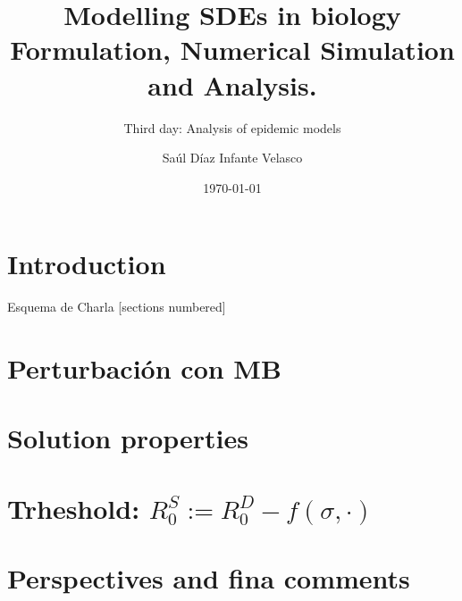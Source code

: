 \documentclass[9pt]{beamer}
\title{Modelling SDEs in biology\\
    Formulation, Numerical Simulation and Analysis.}
\subtitle{Third day: Analysis of epidemic models}
\author{Saúl Díaz Infante Velasco}
\institute{CONACYT-UNIVERSIDAD de SONORA, Cimat, Guanajuato Gto}
\date{\today}
\begin{document}
    \titlepage
    
    \section{Introduction}
         
         
         
         
        \begin{frame}{Esquema de Charla}
            [sections numbered]
            \tableofcontents[hideallsubsections]
        \end{frame}
    \section{Perturbaci\'on con MB}
         
    \section{Solution properties}
         
    \section{%
        Trheshold: %
        $   
            R_0 ^ S := 
                R_0 ^ D 
                -%
                f(\sigma, \cdot)
        $
    }%
         
         
         
     \section{Perspectives and fina comments}
         
\end{document}

